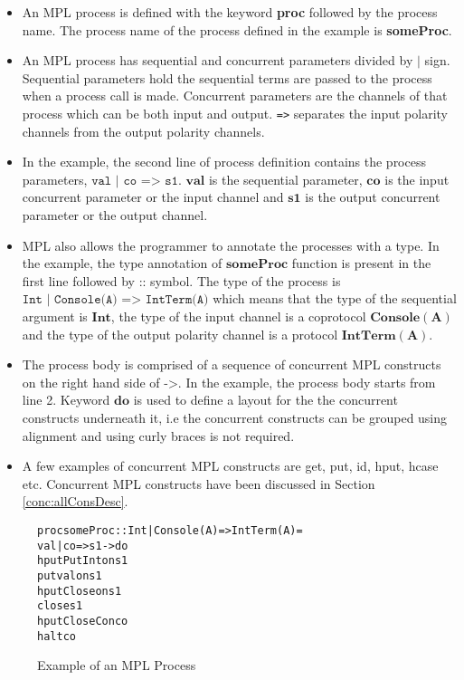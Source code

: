 \documentclass[11pt]{article}
\newcommand{\<}{\langle}
\renewcommand{\>}{\rangle}
\begin{document}
\begin {itemize}
  \item An MPL process is defined with the keyword {\bf proc} followed by the process name. The process name of the process defined in the example is {\bf someProc}.
  \item An MPL process has sequential and concurrent parameters divided by $\mathbf{\mid}$ sign. Sequential parameters hold the sequential terms are passed to the process when a process call is made. Concurrent parameters are the channels of that process which can be both input and output. \texttt{=>} separates the input polarity channels from the output polarity channels.
  \item In the example, the second line of process definition contains the process parameters, $\texttt{val~|~co~=>~s1}$. $\mathbf{val}$ is the sequential parameter, $\mathbf{co}$ is the input concurrent parameter or the input channel and $\mathbf{s1}$ is the output concurrent parameter or the output channel.  
  \item MPL also allows the programmer to annotate the processes with a type. In the example, the type annotation of $\mathbf{someProc}$ function is present in the first line followed by $\texttt{::}$ symbol. The type of the process is $\texttt{Int |~Console(A) => IntTerm(A)}$ which means that the type of the sequential argument is $\mathbf{Int}$, the type of the input channel is a coprotocol $\mathbf{Console(A)}$ and the type of the output polarity channel is a protocol $\mathbf{IntTerm(A)}$.
  \item The process body is comprised of a sequence of concurrent MPL constructs on the right hand side of $\texttt{->}$. In the example, the process body starts from line 2. Keyword $\mathbf {do}$ is used to define a layout for the the concurrent constructs underneath it, i.e the concurrent constructs can be grouped using alignment and using curly braces is not required. 
  \item A few examples of concurrent MPL constructs are {\sf get, put, id, hput, hcase} etc. Concurrent MPL constructs have been discussed in Section \ref {conc:allConsDesc}.
\end {itemize}

 
\begin{figure}
\begin{alltt}


            proc someProc :: Int | Console (A) => IntTerm (A) = 
                val | co => s1 -> do 
                    hput PutInt on s1 
                    put val on s1
                    hput Close on s1 
                    close s1
                    hput CloseC on co
                    halt co

\end{alltt}
\caption{Example of an MPL Process} 
\label{fig:Conc_MPLProcs}\end{figure}
\end{document}

